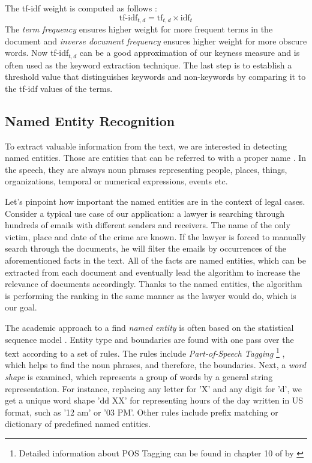 \documentclass[
  digital, %
  table,   %
  lof,     %
  lot,     %
]{fithesis3}
\begin{document}
The tf-idf weight is computed as follows \cite[ch. 6]{manning2008introduction}:
$$
\text{tf-idf}_{t, d} = \text{tf}_{t,d} \times \text{idf}_t
$$
The \textit{term frequency} ensures higher weight for more frequent terms in the document and \textit{inverse document frequency} ensures higher weight for more obscure words. Now tf-idf$_{t, d}$ can be a good approximation of our keyness measure and is often used as the keyword extraction technique. The last step is to establish a threshold value that distinguishes keywords and non-keywords by comparing it to the tf-idf values of the terms.

\subsection{Named Entity Recognition}
To extract valuable information from the text, we are interested in detecting named entities.
Those are entities that can be referred to with a proper name \cite[ch. 21]{jurafsky2014speech}.
In the speech, they are always noun phrases representing people, places, things, organizations, temporal or numerical expressions, events etc.

Let's pinpoint how important the named entities are in the context of legal cases.
Consider a typical use case of our application: a lawyer is searching through hundreds of emails with different senders and receivers.
The name of the only victim, place and date of the crime are known.
If the lawyer is forced to manually search through the documents, he will filter the emails by occurrences of the aforementioned facts in the text.
All of the facts are named entities, which can be extracted from each document and eventually lead the algorithm to increase the relevance of documents accordingly.
Thanks to the named entities, the algorithm is performing the ranking in the same manner as the lawyer would do, which is our goal.

The academic approach to a find \textit{named entity} is often based on the statistical sequence model \cite[ch. 21]{jurafsky2014speech}.
Entity type and boundaries are found with one pass over the text according to a set of rules.
The rules include \textit{Part-of-Speech Tagging} 
\footnote{Detailed information about POS Tagging can be found in chapter 10 of  by \citeauthor{jurafsky2014speech} \cite{jurafsky2014speech}}
, which helps to find the noun phrases, and therefore, the boundaries.
Next, a \textit{word shape} is examined, which represents a group of words by a general string representation. 
For instance, replacing any letter for 'X' and any digit for 'd', we get a unique word shape 'dd XX' for representing hours of the day written in US format, such as '12 am' or '03 PM'. 
Other rules include prefix matching or dictionary of predefined named entities.
\end{document}
